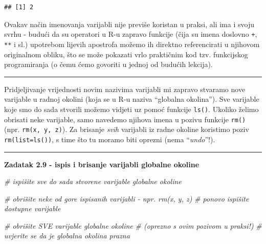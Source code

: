 \documentclass[]{book}
\newenvironment{Shaded}{\begin{snugshade}}{\end{snugshade}}
\newcommand{\DataTypeTok}[1]{\textcolor[rgb]{0.13,0.29,0.53}{#1}}
\newcommand{\DecValTok}[1]{\textcolor[rgb]{0.00,0.00,0.81}{#1}}
\newcommand{\StringTok}[1]{\textcolor[rgb]{0.31,0.60,0.02}{#1}}
\newcommand{\CommentTok}[1]{\textcolor[rgb]{0.56,0.35,0.01}{\textit{#1}}}
\newcommand{\NormalTok}[1]{#1}
\theoremstyle{definition}
\theoremstyle{definition}
\theoremstyle{definition}
\theoremstyle{remark}
\begin{document}
\begin{Shaded}
\end{Shaded}

\begin{verbatim}
## [1] 2
\end{verbatim}

Ovakav način imenovanja varijabli nije previše koristan u praksi, ali
ima i svoju svrhu - budući da su operatori u R-u zapravo funkcije (čija
su imena doslovno \texttt{+}, \texttt{**} i sl.) upotrebom lijevih
apostrofa možemo ih direktno referencirati u njihovom originalnom
obliku, što se može pokazati vrlo praktičnim kod tzv. funkcijskog
programiranja (o čemu ćemo govoriti u jednoj od budućih lekcija).

\begin{center}\rule{0.5\linewidth}{\linethickness}\end{center}

Pridjeljivanje vrijednosti novim nazivima varijabli mi zapravo stvaramo
nove varijable u radnoj okolini (koja se u R-u naziva ``globalna
okolina''). Sve varijable koje smo do sada stvorili možemo vidjeti uz
pomoć funkcije \texttt{ls()}. Ukoliko želimo obrisati neke varijable,
samo navedemo njihova imena u pozivu funkcije \texttt{rm()} (npr.
\texttt{rm(x,\ y,\ z)}). Za brisanje \emph{svih} varijabli iz radne
okoline koristimo poziv \texttt{rm(list=ls())}, s time što tu moramo
biti oprezni (nema ``\emph{undo}''!).

\begin{center}\rule{0.5\linewidth}{\linethickness}\end{center}

\textbf{Zadatak 2.9 - ispis i brisanje varijabli globalne okoline}

\begin{Shaded}
\begin{Highlighting}[]
\CommentTok{# ispišite sve do sada stvorene varijable globalne okoline}

\CommentTok{# obrišite neke od gore ispisanih varijabli - npr. rm(x, y, z)}
\CommentTok{# ponovo ispišite dostupne varijable}

\CommentTok{# obrišite SVE varijable globalne okoline}
\CommentTok{# (oprezno s ovim pozivom u praksi!)}
\CommentTok{# uvjerite se da je globalna okolina prazna}
\end{Highlighting}
\end{Shaded}
\end{document}
